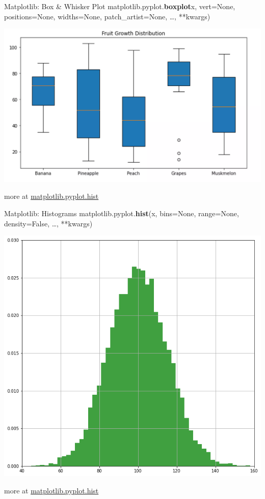 \documentclass{beamer}
\begin{document}
\begin{frame}[fragile]{Matplotlib: Box \& Whisker Plot}
    matplotlib.pyplot.\textbf{boxplot}x, vert=None, positions=None, widths=None, patch_artist=None, \dots, **kwargs)\\
    \begin{center}
        \includegraphics[width=\textwidth,height=0.6\textheight,keepaspectratio]{figures/boxplot.png}\\
    \end{center}
    more at \href{https://matplotlib.org/stable/api/_as_gen/matplotlib.pyplot.hist.html}{matplotlib.pyplot.hist}
\end{frame}
\begin{frame}[fragile]{Matplotlib: Histograms}
    matplotlib.pyplot.\textbf{hist}(x, bins=None, range=None, density=False, \dots, **kwargs)\\
    \begin{center}
        \includegraphics[width=\textwidth,height=0.6\textheight,keepaspectratio]{figures/Hist.png}\\
    \end{center}
    more at \href{https://matplotlib.org/stable/api/_as_gen/matplotlib.pyplot.hist.html}{matplotlib.pyplot.hist}
\end{frame}
\end{document}
